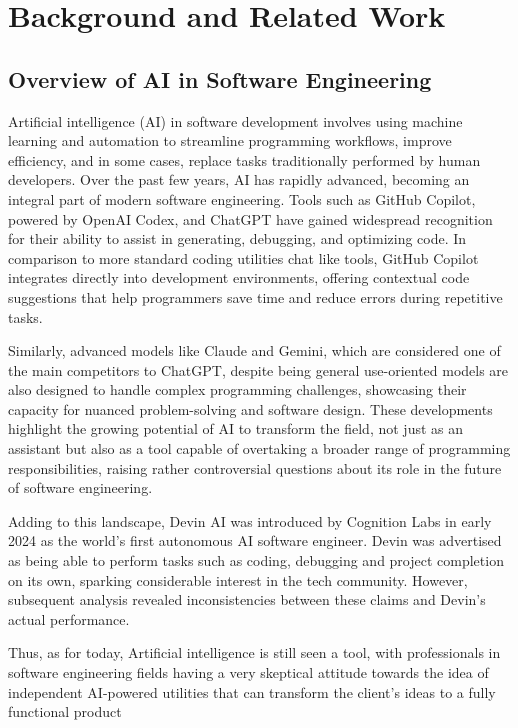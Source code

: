 
\section{Background and Related Work}

\subsection{Overview of AI in Software Engineering}
Artificial intelligence (AI) in software development involves using machine learning and automation to streamline programming workflows, improve efficiency, and in some cases, replace tasks traditionally performed by human developers. Over the past few years, AI has rapidly advanced, becoming an integral part of modern software engineering. Tools such as GitHub Copilot, powered by OpenAI Codex, and ChatGPT have gained widespread recognition for their ability to assist in generating, debugging, and optimizing code. In comparison to more standard coding utilities chat like tools, GitHub Copilot integrates directly into development environments, offering contextual code suggestions that help programmers save time and reduce errors during repetitive tasks. 

Similarly, advanced models like Claude and Gemini, which are considered one of the main competitors to ChatGPT, despite being general use-oriented models are also designed to handle complex programming challenges, showcasing their capacity for nuanced problem-solving and software design. These developments highlight the growing potential of AI to transform the field, not just as an assistant but also as a tool capable of overtaking a broader range of programming responsibilities, raising rather controversial questions about its role in the future of software engineering.

Adding to this landscape, Devin AI was introduced by Cognition Labs in early 2024 as the world's first autonomous AI software engineer. Devin was advertised as being able to perform tasks such as coding, debugging and project completion on its own, sparking considerable interest in the tech community. However, subsequent analysis revealed inconsistencies between these claims and Devin's actual performance.

Thus, as for today, Artificial intelligence is still seen a tool, with professionals in software engineering fields having a very skeptical attitude towards the idea of independent AI-powered utilities that can transform the client’s ideas to a fully functional product

